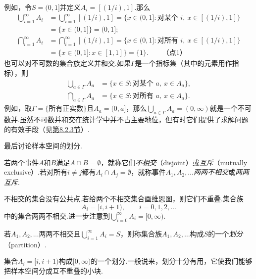 
例如，令$S=(0,1]$并定义$A_i=[(1/i),1]$.那么
$$\begin{aligned}
\bigcup_{i=1}^{\infty}A_i&=\bigcup_{i=1}^{\infty}[(1/i),1]=\{x\in(0,1]:\text{对某个 }i,\ x\in[(1/i),1]\}\\
&=\{x\in(0,1]\}=(0,1];\\
\bigcap_{i=1}^{\infty}A_i&=\bigcap_{i=1}^{\infty}[(1/i),1]=\{x\in(0,1]:\text{对所有 }i,\ x\in[(1/i),1]\}\\
&=\{x\in(0,1]:x\in[1,1]\}=\{1\}.\qquad\text{（点1）}
\end{aligned}$$
也可以对不可数的集合族定义并和交.如果$\Gamma$是一个指标集（其中的元素用作指标），则
$$\begin{aligned}
\bigcup_{a\in\Gamma}A_a&=\{x\in S:\text{对某个 }a,\ x\in A_a\},\\
\bigcap_{a\in\Gamma}A_a&=\{x\in S:\text{对所有 }a,\ x\in A_a\}.
\end{aligned}$$
例如，取$\Gamma=\{\text{所有正实数}\}$且$A_a=(0,a]$，那么$\bigcup_{a\in\Gamma}A_a=(0,\infty)$就是一个不可数并.虽然不可数并和交在统计学中并不占主要地位，但有时它们提供了求解问题的有效手段（见\hyperref[sec:8.2.3]{第8.2.3节}）.

最后讨论样本空间的划分.
\begin{definition}\label{def:1.1.5}
若两个事件$A$和$B$满足$A\cap B=\emptyset$，就称它们\emph{不相交}（disjoint）或\emph{互斥}（mutually exclusive）.若对所有$i\ne j$都有$A_i\cap A_j=\emptyset$，就称事件$A_1,A_2,\ldots$\emph{两两不相交}或\emph{两两互斥}.
\end{definition}
不相交的集合没有公共点.若给两个不相交集合画维恩图，则它们不重叠.集合族
$$A_i=[i,i+1),\qquad i=0,1,2,\ldots$$
中的集合两两不相交.进一步注意到$\bigcup_{i=0}^{\infty}A_i=[0,\infty)$.
\begin{definition}\label{def:1.1.6}
若$A_1,A_2,\ldots$两两不相交且$\bigcup_{i=1}^{\infty}A_i=S$，则称集合族$A_1,A_2,\ldots$构成$S$的一个\emph{划分}（partition）.
\end{definition}
集合$A_i=[i,i+1)$构成$[0,\infty)$的一个划分.一般说来，划分十分有用，它使我们能够把样本空间分成互不重叠的小块.
